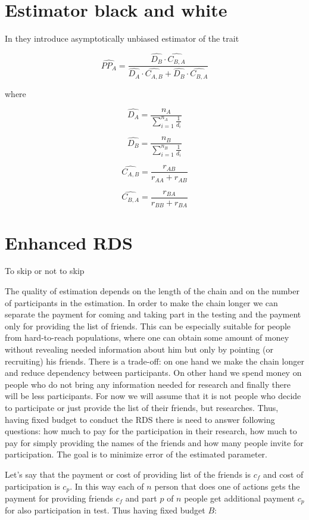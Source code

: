 \documentclass[12pt]{report}
\begin{document}
\section{Estimator black and white}

In \cite{salganik2004sampling} they introduce asymptotically unbiased estimator of the trait

$$ \widehat{PP_A} = \frac{ \widehat{D_B} \cdot \widehat{C_{B, A}}}{ 
\widehat{D_A} \cdot \widehat{C_{A, B}} + \widehat{D_B} \cdot \widehat{C_{B, A}}} $$

where

$$ \widehat{D_A} = \frac{n_A}{ \sum_{i=1}^{n_A} \frac{1}{d_i}} $$

$$ \widehat{D_B} = \frac{n_B}{ \sum_{i=1}^{n_B} \frac{1}{d_i}} $$

$$ \widehat{C_{A, B}} = \frac{r_{AB}}{r_{AA} + r_{AB}} $$

$$ \widehat{C_{B, A}} = \frac{r_{BA}}{r_{BB} + r_{BA}} $$


\section{Enhanced RDS}
To skip or not to skip



The quality of estimation depends on the length of the chain and on the number of participants in the estimation.
In order to make the chain longer we can separate the payment for coming and taking part in the testing and the payment only for providing the list of friends.
This can be especially suitable for people from hard-to-reach populations, where one can obtain some amount of money without revealing needed information about him but only by pointing (or recruiting) his friends. There is a trade-off: on one hand we make the chain longer and reduce dependency between participants. On other hand we spend money on people who do not bring any information needed for research and finally there will be less participants. 
For now we will assume that it is not people who decide to participate or just provide the list of their friends, but researches. Thus, having fixed budget to conduct the RDS there is need to answer following questions: how much to pay for the participation in their research, how much to pay for simply providing the names of the friends and how many people invite for participation. The goal is to minimize error of the estimated parameter.

Let's say that the payment or cost of providing list of the friends is $c_f$ and cost of participation is $c_p$. In this way each of $n$ person that does one of actions gets the payment for providing friends $c_f$ and part $p$ of $n$ people get additional payment $c_p$ for also participation in test.
Thus having fixed budget $B$:
\end{document}

